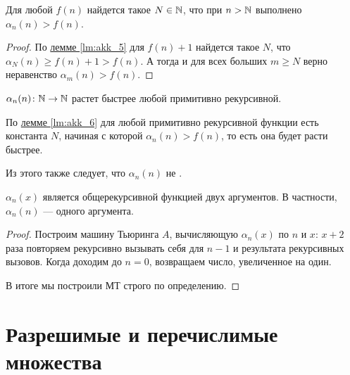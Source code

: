 \begin{lm}\label{lm:akk_6}
	Для любой \prf $ f(n)$ найдется такое  $ N \in \mathbb{N}$, что при $ n > \mathbb{N}$ выполнено  $  \alpha _n(n) > f(n)$.
\end{lm}
\begin{proof}
	По \hyperref[lm:akk_5]{лемме \ref{lm:akk_5}} для $ f(n) + 1$ найдется такое $ N$, что $  \alpha _N(n) \ge  f(n) + 1 > f(n)$. А тогда и для всех больших $ m \ge N$ верно неравенство $  \alpha _m(n) > f(n)$.
\end{proof}
\begin{thm}
	$ \alpha _{n}(n) \colon \mathbb{N} \to \mathbb{N}$  растет быстрее любой примитивно рекурсивной.
\end{thm}
\begin{proof*}
	По \hyperref[lm:akk_5]{лемме \ref{lm:akk_6}} для любой примитивно рекурсивной функции есть константа $ N$, начиная с которой  $  \alpha _n(n) > f(n)$, то есть она будет расти быстрее.

	Из этого также следует, что $  \alpha _n(n)$ не \prf.
\end{proof*}
\begin{lm}\label{lm:akk_7}
	$ \alpha _n(x)$ является общерекурсивной функцией двух аргументов. В частности, $  \alpha _n(n)$ --- одного аргумента.
\end{lm}
\begin{proof}
	Построим машину Тьюринга $ A$, вычисляющую $ \alpha _n(x)$ по $ n$ и  $ x$: $ x+2$ раза повторяем рекурсивно вызывать себя для $ n-1$ и результата рекурсивных вызовов. Когда доходим до $ n  = 0$, возвращаем число, увеличенное на один. 

	В итоге мы построили МТ строго по определению.
\end{proof}

\chapter{Разрешимые и перечислимые множества}
